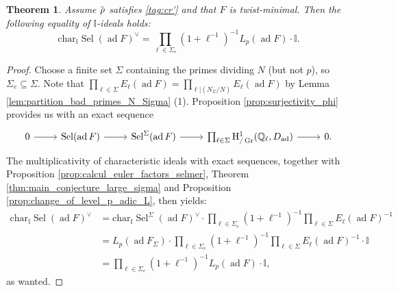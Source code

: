 \documentclass[12pt]{amsart}
\newcommand\bI{\mathbb{I}}
\newcommand\bQ{\mathbb{Q}}
\newcommand{\ob}[1]{\mkern 1.5mu\overline{\mkern-1.5mu#1\mkern-1.5mu}\mkern 1.5mu}
\renewcommand{\char}{\textrm{char}}
\DeclareMathOperator{\ad}{ad}
\DeclareMathOperator{\Sel}{Sel}
\DeclareMathOperator{\Gr}{Gr}
\newcommand{\HH}{\mathrm{H}}
\theoremstyle{defstyle}
\theoremstyle{thmstyle}
\newtheorem{theorem}[subsubsection]{Theorem}
\begin{document}
\begin{theorem}\label{thm:main_3}
	Assume $\ob{\rho}$ satisfies \eqref{tag:cr'} and that $F$ is twist-minimal. Then the following equality of $\bI$-ideals holds:
	\[\char_\bI \Sel(\ad F)^\vee = \prod_{\ell\in\Sigma_e}(1+\ell^{-1})^{-1}L_p(\ad F)\cdot \bI.\]
\end{theorem}
\begin{proof}
	Choose a finite set $\Sigma$ containing the primes dividing $N$ (but not $p$), so $\Sigma_e\subseteq \Sigma$. Note that $\prod_{\ell\in \Sigma}E_\ell(\ad F)=\prod_{\ell|(N_\Sigma/N)}E_\ell(\ad F)$ by Lemma \ref{lem:partition_bad_primes_N_Sigma} (1). Proposition \ref{prop:surjectivity_phi} provides us with an exact sequence
	\small\[\begin{tikzcd}
		0 \rar & \Sel(\ad F) \rar &   \Sel^\Sigma(\ad F) \rar & \prod_{\ell\in \Sigma} \HH^1_{\slash\Gr}(\bQ_\ell,D_{\ad}) \rar & 0.
	\end{tikzcd}\]\normalsize
	The multiplicativity of characteristic ideals with exact sequences, together with Proposition \ref{prop:calcul_euler_factors_selmer}, Theorem \ref{thm:main_conjecture_large_sigma} and Proposition \ref{prop:change_of_level_p_adic_L}, then yields:
	\begin{align*}
		\char_{\bI}\Sel(\ad F)^\vee   &= \char_{\bI}\Sel^\Sigma(\ad F)^\vee\cdot \prod_{\ell\in\Sigma_e}(1+\ell^{-1})^{-1} \prod_{\ell\in \Sigma}E_\ell(\ad F)^{-1} \\
										&= L_p(\ad F_\Sigma)\cdot \prod_{\ell\in\Sigma_e}(1+\ell^{-1})^{-1}\prod_{\ell\in \Sigma}E_\ell(\ad F)^{-1}\cdot \bI \\
										&=\prod_{\ell\in\Sigma_e}(1+\ell^{-1})^{-1}L_p(\ad F)\cdot \bI, 
	\end{align*}
	as wanted.
\end{proof}



\appendix
\end{document}
